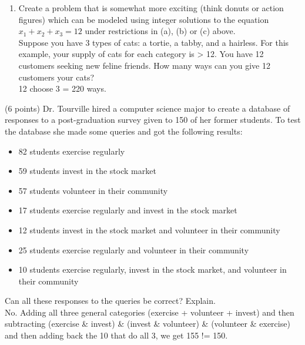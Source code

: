 \documentclass[12pt, letterpaper]{article}
\begin{document}
\begin{flushleft}
\begin{enumerate}
\begin{item}
\begin{enumerate}
    \item Create a problem that is somewhat more exciting (think donuts or action figures) which can be modeled using integer solutions to the equation $x_1+x_2+x_3=12$ under restrictions in (a), (b) or (c) above. \\

      Suppose you have 3 types of cats: a tortie, a tabby, and a hairless. For this example, your supply of cats for each category is > 12. You have 12 customers seeking new feline friends. How many ways can you give 12 customers your cats? \\
      12 choose 3 = 220 ways. \\
    \end{enumerate}
  \end{item}

  \begin{item} (6 points) Dr. Tourville hired a computer science major to create a database of responses to a post-graduation survey given to 150 of her former students. To test the database she made some queries and got the following results:\\
    \begin{itemize}
    \item 82 students exercise regularly \\
    \item 59 students invest in the stock market \\
    \item 57 students volunteer in their community \\
    \item 17 students exercise regularly and invest in the stock market \\
    \item 12 students invest in the stock market and volunteer in their community \\
    \item 25 students exercise regularly and volunteer in their community \\
    \item 10 students exercise regularly, invest in the stock market, and volunteer in their community \\
    \end{itemize}
    \smallskip
    Can all these responses to the queries be correct? Explain. \\
    No. Adding all three general categories (exercise + volunteer + invest) and then subtracting (exercise \& invest) \& (invest \& volunteer) \& (volunteer \& exercise) and then adding back the 10 that do all 3, we get 155 != 150. \\

\end{item}
\end{enumerate}
\end{flushleft}
\end{document}
